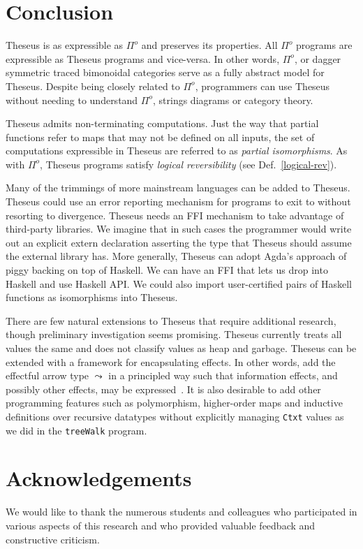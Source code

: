 \documentclass{article}
\newcommand{\ctr}[1]{{\scriptsize{\texttt{#1}}}}
\begin{document}
\section{Conclusion}
\label{conc}

Theseus is as expressible as \ensuremath{\Pi^{o}} and preserves its properties. All
\ensuremath{\Pi^{o}} programs are expressible as Theseus programs and vice-versa. In other
words, \ensuremath{\Pi^{o}}, or dagger symmetric traced bimonoidal categories serve as a
fully abstract model for Theseus. Despite being closely related to \ensuremath{\Pi^{o}},
programmers can use Theseus without needing to understand \ensuremath{\Pi^{o}}, strings
diagrams or category theory.

Theseus admits non-terminating computations. Just the way that partial
functions refer to maps that may not be defined on all inputs, the set
of computations expressible in Theseus are referred to as
\emph{partial isomorphisms}. As with \ensuremath{\Pi^{o}}, Theseus programs satisfy
\emph{logical reversibility} (see Def.~\ref{logical-rev}).

Many of the trimmings of more mainstream languages can be added to
Theseus. Theseus could use an error reporting mechanism for programs to exit
to without resorting to divergence. Theseus needs an FFI mechanism to take
advantage of third-party libraries. We imagine that in such cases the
programmer would write out an explicit extern declaration asserting the type
that Theseus should assume the external library has. More generally, Theseus
can adopt Agda's approach of piggy backing on top of Haskell. We can have an
FFI that lets us drop into Haskell and use Haskell API. We could also import
user-certified pairs of Haskell functions as isomorphisms into Theseus.

There are few natural extensions to Theseus that require additional research,
though preliminary investigation seems promising. Theseus currently treats
all values the same and does not classify values as heap and garbage.
Theseus can be extended with a framework for encapsulating effects. In other
words, add the effectful arrow type \ensuremath{\leadsto} in a principled way such that
information effects, and possibly other effects, may be
expressed~\cite{James:2012:IE:2103656.2103667}.  It is also desirable to add
other programming features such as polymorphism, higher-order maps and
inductive definitions over recursive datatypes without explicitly managing
\ctr{Ctxt} values as we did in the \ctr{treeWalk} program.


\section*{Acknowledgements} We would like to thank the numerous
students and colleagues who participated in various aspects of this
research and who provided valuable feedback and constructive criticism.



\end{document}
